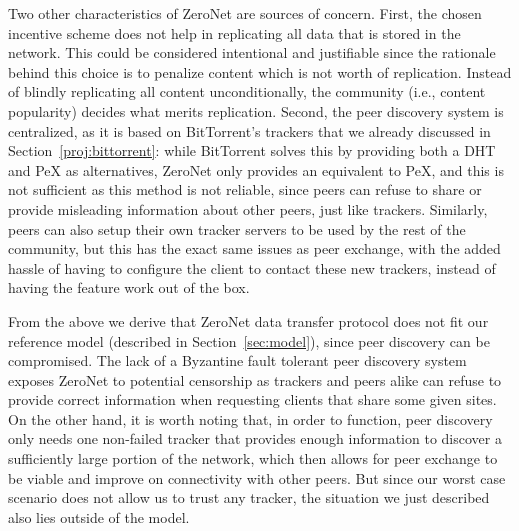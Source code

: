 \documentclass[mscthesis]{usiinfthesis}
\begin{document}
Two other characteristics of ZeroNet are sources of concern. First, the chosen incentive scheme does not help in replicating all data that is stored in the network.
This could be considered intentional and justifiable since the rationale behind this choice is to penalize content which is not worth of replication. Instead of blindly replicating all content unconditionally, the community (i.e., content popularity) decides what merits replication. Second, the peer discovery system is centralized, as it is based on BitTorrent's trackers that we already discussed in Section~\ref{proj:bittorrent}: while BitTorrent solves this by providing both a DHT and PeX as alternatives, ZeroNet only provides an equivalent to PeX, and this is not sufficient as this method is not reliable, since peers can refuse to share or provide misleading information about other peers, just like trackers. Similarly, peers can also setup their own tracker servers to be used by the rest of the community, but this has the exact same issues as peer exchange, with the added hassle of having to configure the client to contact these new trackers, instead of having the feature work out of the box.

From the above we derive that ZeroNet data transfer protocol does not fit our reference model (described in Section~\ref{sec:model}), since peer discovery can be compromised. The lack of a Byzantine fault tolerant peer discovery system exposes ZeroNet to potential censorship as trackers and peers alike can refuse to provide correct information when requesting clients that share some given sites. On the other hand, it is worth noting that, in order to function, peer discovery only needs one non-failed tracker that provides enough information to discover a sufficiently large portion of the network, which then allows for peer exchange to be viable and improve on connectivity with other peers. But since our worst case scenario does not allow us to trust any tracker, the situation we just described also lies outside of the model.
\end{document}
